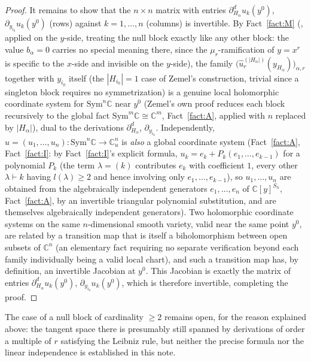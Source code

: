 \documentclass[11pt]{article}
\theoremstyle{remark}
\newcommand{\CC}{\mathbb{C}}
\begin{document}
\begin{proof}
It remains to show that the $n\times n$ matrix with entries $\partial_{H_\alpha}^du_k(y^0)$, $\partial_{y_{i_0}}u_k(y^0)$ (rows) against $k=1,\dots,n$ (columns) is invertible. By Fact~\ref{fact:M} (\cite[Theorem~34]{Ze}, applied on the $y$-side, treating the null block exactly like any other block: the value $b_\alpha=0$ carries no special meaning there, since the $\mu_r$-ramification of $y=x^r$ is specific to the $x$-side and invisible on the $y$-side), the family $\big(\hat u_r^{(|H_\alpha|)}(y_{H_\alpha})\big)_{\alpha,r}$ together with $y_{i_0}$ itself (the $|H_{i_0}|=1$ case of Zemel's construction, trivial since a singleton block requires no symmetrization) is a genuine local holomorphic coordinate system for $\mathrm{Sym}^n\CC$ near $y^0$ (Zemel's own proof reduces each block recursively to the global fact $\mathrm{Sym}^m\CC\cong\CC^m$, Fact~\ref{fact:A}, applied with $n$ replaced by $|H_\alpha|$), dual to the derivations $\partial_{H_\alpha}^d$, $\partial_{y_{i_0}}$. Independently, $u=(u_1,\dots,u_n):\mathrm{Sym}^n\CC\to\CC^n_u$ is \emph{also} a global coordinate system (Fact~\ref{fact:A}, Fact~\ref{fact:I}: by Fact~\ref{fact:I}'s explicit formula, $u_k=e_k+P_k(e_1,\dots,e_{k-1})$ for a polynomial $P_k$ (the term $\lambda=(k)$ contributes $e_k$ with coefficient $1$, every other $\lambda\vdash k$ having $l(\lambda)\ge2$ and hence involving only $e_1,\dots,e_{k-1}$), so $u_1,\dots,u_n$ are obtained from the algebraically independent generators $e_1,\dots,e_n$ of $\CC[y]^{S_n}$, Fact~\ref{fact:A}, by an invertible triangular polynomial substitution, and are themselves algebraically independent generators). Two holomorphic coordinate systems on the same $n$-dimensional smooth variety, valid near the same point $y^0$, are related by a transition map that is itself a biholomorphism between open subsets of $\CC^n$ (an elementary fact requiring no separate verification beyond each family individually being a valid local chart), and such a transition map has, by definition, an invertible Jacobian at $y^0$. This Jacobian is exactly the matrix of entries $\partial_{H_\alpha}^du_k(y^0)$, $\partial_{y_{i_0}}u_k(y^0)$, which is therefore invertible, completing the proof.
\end{proof}

The case of a null block of cardinality $\ge2$ remains open, for the reason explained above: the tangent space there is presumably still spanned by derivations of order a multiple of $r$ satisfying the Leibniz rule, but neither the precise formula nor the linear independence is established in this note.
\end{document}
